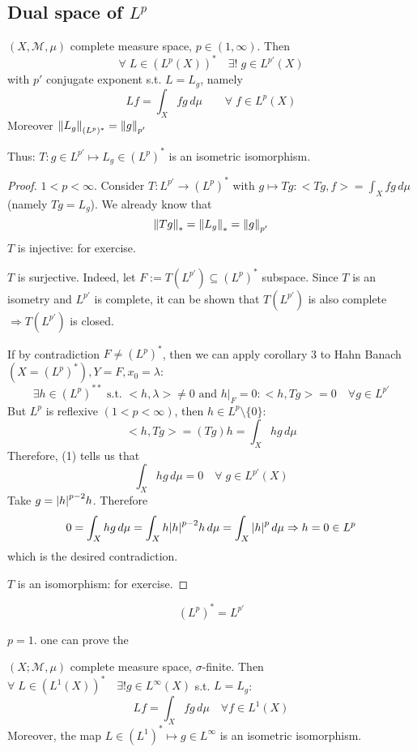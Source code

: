 \subsection*{Dual space of \(L^p\)}

\begin{theorem}
    \((X, \mathcal{M}, \mu)\) complete measure space, \(p \in (1, \infty)\). Then 
    \[
        \forall\; L \in (L^p(X))^* \quad \exists! \; g \in L^{p'}(X)
    \]
    with \(p' \) conjugate exponent s.t. \(L=L_g\), namely
    \[
        Lf = \int_X fg \, d\mu \qquad \forall\; f \in L^p(X)
    \]
    Moreover \(\norm{L_g}_{(L^p)^*} = \norm{g}_{p'}\)
    
    Thus: \(T: g \in L^{p'} \mapsto L_g \in (L^p)^*\) is an isometric isomorphism.
\end{theorem}
\begin{proof}
    \(1 < p < \infty\). Consider \(T: L^{p'} \to (L^p)^*\) with \(g \mapsto Tg: <Tg, f> = \int_X fg \, d\mu\) (namely \(Tg = L_g\)). We already know that
    \[
        \norm{Tg}_* = \norm{L_g}_* = \norm{g}_{p'}
    \]
    \(T\) is injective: for exercise.

    \(T\) is surjective. Indeed, let \(F:= T(L^{p'}) \subseteq (L^p)^*\) subspace. Since \(T\) is an isometry and \(L^{p'}\) is complete, it can be shown that \(T(L^{p'})\) is also complete \(\Rightarrow T(L^{p'})\) is closed.

    If by contradiction \(F \neq (L^p)^*\), then we can apply corollary 3 to Hahn Banach \((X = (L^p)^*), Y=F, x_0 = \lambda\):
    \[
        \exists h \in (L^p)^{**} \text{ s.t. } <h, \lambda> \neq 0 \text{ and } h|_F = 0: <h, Tg> =0 \quad \forall g \in L^{p'} \tag*{1} 
    \]
    But \(L^p \) is reflexive \((1 <p < \infty)\), then \(h \in L^p \setminus \{0\}\):
    \[
        <h, Tg> = (Tg)h = \int_X hg \, d\mu
    \]
    Therefore, (1) tells us that
    \[
        \int_X hg \, d\mu =0 \quad \forall \; g \in L^{p'}(X)
    \]
    Take \(g = \abs{h}^{p-2}h\). Therefore
    \[
        0 = \int_X hg \, d\mu = \int_X h \abs{h}^{p-2} h \, d\mu = \int_X \abs{h}^p \, d\mu \Rightarrow h=0 \in L^p
    \]
    which is the desired contradiction.

    \(T\) is an isomorphism: for exercise.
\end{proof}

\[
    (L^p)^* = L^{p'}
\]

\begin{remark}
    \(p=1\). one can prove the
\end{remark}
\begin{theorem}
    \((X; \mathcal{M}, \mu)\) complete measure space, \(\sigma\)-finite.
    Then \(\forall\; L \in (L^1(X))^* \quad \exists! g \in L^\infty(X)\) s.t. \(L=L_g\):
    \[
        Lf = \int_X fg \, d\mu \quad \forall f \in L^1(X)
    \]
    Moreover, the map \(L \in (L^1)^* \mapsto g \in L^\infty\) is an isometric isomorphism.
\end{theorem}

